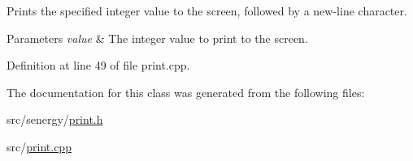 Prints the specified integer value to the screen, followed by a new-\/line character. 


\begin{DoxyParams}{Parameters}
{\em value} & The integer value to print to the screen. \\
\hline
\end{DoxyParams}


Definition at line 49 of file print.\-cpp.



The documentation for this class was generated from the following files\-:\begin{DoxyCompactItemize}
\item 
src/senergy/\hyperlink{print_8h}{print.\-h}\item 
src/\hyperlink{print_8cpp}{print.\-cpp}\end{DoxyCompactItemize}
